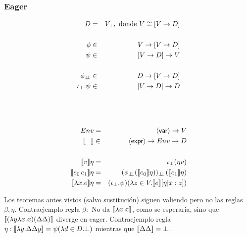     \subsubsection{Eager}
      \begin{multicols}{2}
        \begin{eqnarray*}
          D &=& V_\bot, \text{ donde } V \cong [V \to D] \\ \\
          \phi &\in& V \to [V \to D] \\
          \psi &\in& [V \to D] \to V \\ \\
          \phi_{\bot\!\!\!\bot} &\in& D \to [V \to D] \\
          \iota_\bot . \psi &\in& [V \to D] \to D
        \end{eqnarray*}
        \begin{eqnarray*}
          \\ \\ \\
          Env &=& \langle \mathsf{var} \rangle \to V \\
          \llbracket\_\rrbracket &\in& \langle \mathsf{expr} \rangle \to Env \to D \\ \\
          \llbracket v\rrbracket\eta &=& \iota_\bot (\eta v) \\
          \llbracket e_0\, e_1\rrbracket\eta &=& (\phi_{\bot\!\!\!\bot} (\llbracket e_0\rrbracket\eta))_{\bot\!\!\!\bot}\, (\llbracket e_1\rrbracket\eta)\\
          \llbracket\lambda x.e\rrbracket\eta &=& (\iota_\bot . \psi)(\lambda z \in V. \llbracket e\rrbracket[\eta|x:z])
        \end{eqnarray*}
      \end{multicols}
      \PN Los teoremas antes vistos (salvo sustitución) siguen valiendo pero no las reglas $\beta, \eta$.
      \PN Contraejemplo regla $\beta:$ No da $[\![\lambda x. x]\!]$, como se esperaria, sino que $[\![(\lambda y \lambda x.x)(\Delta \Delta)]\!]$ diverge en eager.
      \PN Contraejemplo regla $\eta: [\![\lambda y. \Delta\Delta y]\!] = \psi(\lambda d \in D.\bot)$ mientras que $[\![\Delta\Delta]\!] = \bot$.